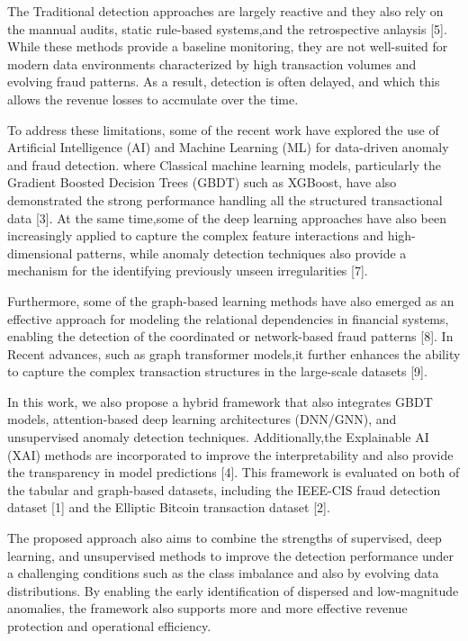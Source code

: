 \documentclass[conference]{IEEEtran}
\begin{document}
The Traditional detection approaches are largely reactive and they also rely on the mannual audits, static rule-based systems,and the retrospective anlaysis [5]. While these methods provide a baseline monitoring, they are not well-suited for modern data environments characterized by high transaction volumes and evolving fraud patterns. As a result, detection is often delayed, and which this allows the revenue losses to accmulate over the time.


To address these limitations, some of the recent work have explored the use of Artificial Intelligence (AI) and Machine Learning (ML) for data-driven anomaly and fraud detection. where Classical machine learning models, particularly the  Gradient Boosted Decision Trees (GBDT) such as XGBoost, have also demonstrated the  strong performance  handling all the structured transactional data [3]. At the same time,some of the  deep learning approaches have also been increasingly applied to capture the complex feature interactions and high-dimensional patterns, while anomaly detection techniques also provide a mechanism for the identifying previously unseen irregularities [7].

Furthermore, some of the graph-based learning methods have also emerged as an effective approach for modeling the relational dependencies in financial systems, enabling the detection of the coordinated or network-based fraud patterns [8]. In Recent advances, such as graph transformer models,it further enhances the ability to capture the complex transaction structures in the large-scale datasets [9].

In this work, we also propose a hybrid framework that also integrates GBDT models, attention-based deep learning architectures (DNN/GNN), and unsupervised anomaly detection techniques. Additionally,the Explainable AI (XAI) methods are incorporated to improve the interpretability and also provide the transparency in model predictions [4]. This framework is evaluated on both of the  tabular and graph-based datasets, including the IEEE-CIS fraud detection dataset [1] and the Elliptic Bitcoin transaction dataset [2].

The proposed approach also aims to combine the strengths of supervised, deep learning, and unsupervised methods to improve the detection performance under a challenging conditions such as the class imbalance and also by evolving data distributions. By enabling the early identification of dispersed and low-magnitude anomalies, the framework also supports more and more effective revenue protection and operational efficiency.
\end{document}
